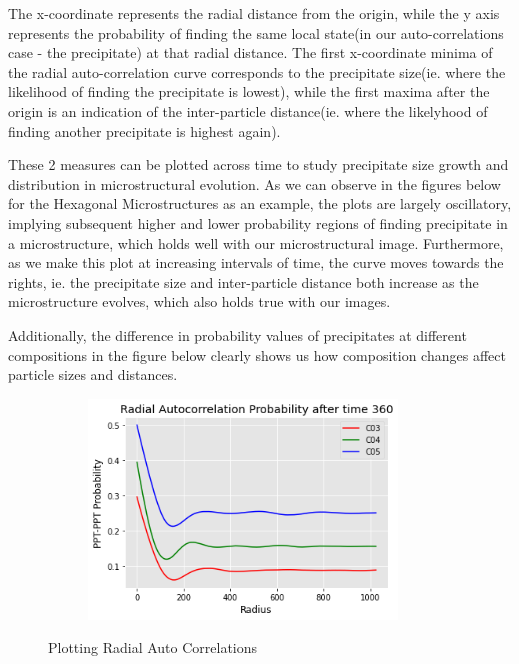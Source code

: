 \documentclass[12pt, a4paper]{report}
\begin{document}
The x-coordinate represents the radial distance from the origin, while the y axis represents the probability of finding the same local state(in our auto-correlations case - the precipitate) at that radial distance. The first x-coordinate minima of the radial auto-correlation curve corresponds to the precipitate size(ie. where the likelihood of finding the precipitate is lowest), while the first maxima after the origin is an indication of the inter-particle distance(ie. where the likelyhood of finding another precipitate is highest again).

These 2 measures can be plotted across time to study precipitate size growth and distribution in microstructural evolution. As we can observe in the figures below for the Hexagonal Microstructures as an example, the plots are largely oscillatory, implying subsequent higher and lower probability regions of finding precipitate in a microstructure, which holds well with our microstructural image. Furthermore, as we make this plot at increasing intervals of time, the curve moves towards the rights, ie. the precipitate size and inter-particle distance both increase as the microstructure evolves, which also holds true with our images.

Additionally, the difference in probability values of precipitates at different compositions in the figure below clearly shows us how composition changes affect particle sizes and distances.

\begin{figure}[H]
\centering
\begin{subfigure}{.9\textwidth}
  \centering
  \includegraphics[width=0.9\textwidth]{Pictures/MSFeatures/RadialCorrExample.png}
  \label{img:microstrImg}
\end{subfigure}
\caption{Plotting Radial Auto Correlations}
\label{fig:test}
\end{figure}
\end{document}
